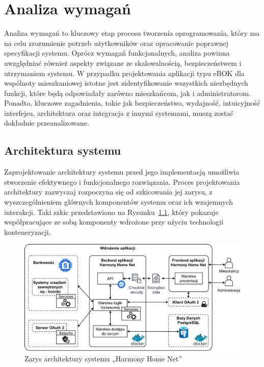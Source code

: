\chapter{Analiza wymagań}
Analiza wymagań to kluczowy etap procesu tworzenia oprogramowania, który ma na celu zrozumienie potrzeb użytkowników oraz opracowanie poprawnej specyfikacji systemu. Oprócz wymagań funkcjonalnych, analiza powinna uwzględniać również aspekty związane ze skalowalnością, bezpieczeństwem i utrzymaniem systemu. W przypadku projektowania aplikacji typu eBOK dla wspólnoty mieszkaniowej istotne jest zidentyfikowanie wszystkich niezbędnych funkcji, które będą odpowiadały zarówno mieszkańcom, jak i administratorom. Ponadto, kluczowe zagadnienia, takie jak bezpieczeństwo, wydajność, intuicyjność interfejsu, architektura oraz integracja z innymi systemami, muszą zostać dokładnie przeanalizowane.

\section{Architektura systemu} 
Zaprojektowanie architektury systemu przed jego implementacją umożliwia stworzenie efektywnego i funkcjonalnego rozwiązania. Proces projektowania architektury zazwyczaj rozpoczyna się od szkicowania jej zarysu, z wyszczególnieniem głównych komponentów systemu oraz ich wzajemnych interakcji. Taki szkic przedstawiono na Rysunku~\ref{fig:zarys_architektury}, który pokazuje współpracujące ze sobą komponenty wdrożone przy użyciu technologii konteneryzacji.

\begin{figure}[ht]
    \centering
    \includegraphics[width=\linewidth]{rys02/zarys_architektury}
    \caption{Zarys architektury systemu „Harmony Home Net”}
    \label{fig:zarys_architektury}
\end{figure}

